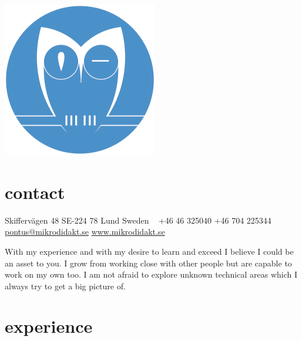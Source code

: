\documentclass[nocolors]{template/friggeri-cv-a4}
\begin{document}


\begin{aside} %
\includegraphics[scale=0.20] {template/Uggla_256.png}
\section{contact}
Skiffervägen 48
SE-224 78 Lund
Sweden
~
+46 46 325040
+46 704 225344
~
\href{mailto:pontus.zigher@mikrodidakt.se}{pontus@mikrodidakt.se}
\href{http://www.mikrodidakt.se}{www.mikrodidakt.se}
\end{aside}


With my experience and with my desire to learn and exceed I believe I could be an asset to you. I grow from working close with other people but are capable to work on my own too. I am not afraid to explore unknown technical areas which I always try to get a big picture of.


\section{experience}
\end{document}
